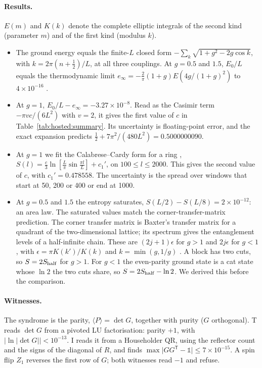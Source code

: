 \paragraph{Results.} $E(m)$ and $K(k)$ denote the complete elliptic integrals of the second kind (parameter $m$) and of the first kind
(modulus $k$).
\begin{itemize}[nosep]
\item[(a)] The ground energy equals the finite-$L$ closed form $-\sum_k\sqrt{1+g^2-2g\cos k}$, with $k=2\pi(n+\tfrac12)/L$, at all three
couplings. At $g=0.5$ and $1.5$, $E_0/L$ equals the thermodynamic limit $e_\infty=-\tfrac2\pi(1+g)E(4g/(1+g)^2)$ to $4\times10^{-16}$
\cite{pfeuty1970}.
\item[(b)] At $g=1$, $E_0/L-e_\infty=-3.27\times10^{-8}$. Read as the Casimir term $-\pi vc/(6L^2)$ with $v=2$, it gives the first value of
$c$ in Table~\ref{tab:hosted:summary}. Its uncertainty is floating-point error, and the exact expansion predicts
$\tfrac12+7\pi^2/(480L^2)=0.5000000090$.
\item[(c)] At $g=1$ we fit the Calabrese--Cardy form for a ring \cite{calabrese2004}, $S(l)=\tfrac c3\ln[\tfrac L\pi\sin\tfrac{\pi l}L]+c_1'$,
on $100\le l\le2000$. This gives the second value of $c$, with $c_1'=0.478558$. The uncertainty is the spread over windows that start at
50, 200 or 400 or end at 1000.
\item[(d)] At $g=0.5$ and $1.5$ the entropy saturates, $S(L/2)-S(L/8)=2\times10^{-12}$: an area law. The saturated values match the
corner-transfer-matrix prediction. The corner transfer matrix is Baxter's transfer matrix for a quadrant of the two-dimensional lattice;
its spectrum gives the entanglement levels of a half-infinite chain. These are $(2j+1)\epsilon$ for $g>1$ and $2j\epsilon$ for $g<1$,
with $\epsilon=\pi K(k')/K(k)$ and $k=\min(g,1/g)$ \cite[Eqs.~4.30--4.34]{calabrese2004}. A block has two cuts, so $S=2S_{\rm half}$ for
$g>1$. For $g<1$ the even-parity ground state is a cat state whose $\ln2$ the two cuts share, so $S=2S_{\rm half}-\ln2$. We derived this
before the comparison.
\end{itemize}

\paragraph{Witnesses.} The syndrome is the parity, $\langle P\rangle=\det G$, together with purity ($G$ orthogonal). T reads $\det G$ from
a pivoted LU factorisation: parity $+1$, with $\vert\ln\vert\det G\vert\vert<10^{-13}$. I reads it from a Householder QR, using the
reflector count and the signs of the diagonal of $R$, and finds $\max\vert GG^{\mathsf T}-\mathbb1\vert\le7\times10^{-15}$. A spin flip
$Z_1$ reverses the first row of $G$; both witnesses read $-1$ and refuse.

